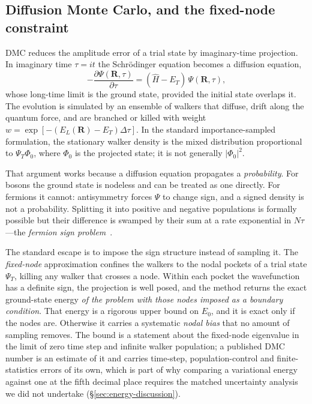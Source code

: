 \subsection{Diffusion Monte Carlo, and the fixed-node constraint}
\label{subsec:dmc-theory}

DMC reduces the amplitude error of a trial state by imaginary-time projection. In imaginary time
$\tau=it$ the Schr\"odinger equation becomes a diffusion equation,
\[
-\frac{\partial \Psi(\mathbf R,\tau)}{\partial\tau} = (\hat H - E_T)\,\Psi(\mathbf R,\tau),
\]
whose long-time limit is the ground state, provided the initial state overlaps it. The
evolution is simulated by an ensemble of walkers that diffuse, drift along the quantum
force, and are branched or killed with weight
$w=\exp[-(E_L(\mathbf R)-E_T)\Delta\tau]$. In the standard importance-sampled formulation,
the stationary walker density is the mixed distribution proportional to
$\Psi_T\Phi_0$, where $\Phi_0$ is the projected state; it is not generally
$|\Phi_0|^2$.

That argument works because a diffusion equation propagates a \emph{probability}. For
bosons the ground state is nodeless and can be treated as one directly. For fermions it
cannot: antisymmetry forces $\Psi$ to change sign, and a signed density is not a
probability. Splitting it into positive and negative populations is formally possible but
their difference is swamped by their sum at a rate exponential in $N\tau$---the
\emph{fermion sign problem}~\cite{PanMeng2024-SignProblemQMC}.

The standard escape is to impose the sign structure instead of sampling it. The
\emph{fixed-node} approximation confines the walkers to the nodal pockets of a trial state
$\Psi_T$, killing any walker that crosses a node. Within each pocket the wavefunction has a
definite sign, the projection is well posed, and the method returns the exact ground-state
energy \emph{of the problem with those nodes imposed as a boundary condition}. That energy is a rigorous upper bound on $E_0$, and it is exact only if the nodes are.
Otherwise it carries a systematic \emph{nodal bias} that no amount of sampling removes. The
bound is a statement about the fixed-node eigenvalue in the limit of zero time step and
infinite walker population; a published DMC number is an estimate of it and carries time-step,
population-control and finite-statistics errors of its own, which is part of why comparing a
variational energy against one at the fifth decimal place requires the matched uncertainty
analysis we did not undertake (\S\ref{sec:energy-discussion}).

